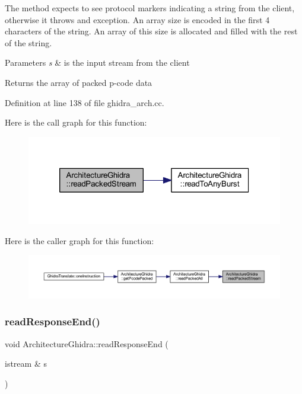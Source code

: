 The method expects to see protocol markers indicating a string from the client, otherwise it throws and exception. An array size is encoded in the first 4 characters of the string. An array of this size is allocated and filled with the rest of the string. 
\begin{DoxyParams}{Parameters}
{\em s} & is the input stream from the client \\
\hline
\end{DoxyParams}
\begin{DoxyReturn}{Returns}
the array of packed p-\/code data 
\end{DoxyReturn}


Definition at line 138 of file ghidra\+\_\+arch.\+cc.

Here is the call graph for this function\+:
\nopagebreak
\begin{figure}[H]
\begin{center}
\leavevmode
\includegraphics[width=320pt]{class_architecture_ghidra_a363a85f21c006421b43cec46fe82df10_cgraph}
\end{center}
\end{figure}
Here is the caller graph for this function\+:
\nopagebreak
\begin{figure}[H]
\begin{center}
\leavevmode
\includegraphics[width=350pt]{class_architecture_ghidra_a363a85f21c006421b43cec46fe82df10_icgraph}
\end{center}
\end{figure}
\mbox{\label{class_architecture_ghidra_a948fffd4d8e181563ade259d97074419}} 
\subsubsection{\texorpdfstring{readResponseEnd()}{readResponseEnd()}}
{\footnotesize\ttfamily void Architecture\+Ghidra\+::read\+Response\+End (\begin{DoxyParamCaption}\item[{istream \&}]{s }\end{DoxyParamCaption})\hspace{0.3cm}{\ttfamily [static]}}



